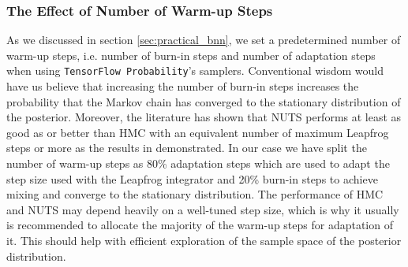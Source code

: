 \subsubsection{The Effect of Number of Warm-up Steps}
As we discussed in section \ref{sec:practical_bnn}, we set a predetermined number of warm-up steps, i.e. number of burn-in steps and number of adaptation steps when using {\tt TensorFlow Probability}'s samplers.
Conventional wisdom would have us believe that increasing the number of burn-in steps increases the probability that the Markov chain has converged
to the stationary distribution of the posterior. Moreover, the literature has shown that NUTS performs at least as good as or better than HMC with an equivalent number of maximum Leapfrog steps or more as the results in \cite{nuts} demonstrated. In our case we have split the number of warm-up steps as 80\% adaptation steps which are used to adapt the step size used with the Leapfrog integrator and 20\% burn-in steps to achieve mixing and converge to the stationary distribution. The performance of HMC and NUTS may depend heavily on a well-tuned step size, which is why it usually is recommended to allocate the majority of the warm-up steps for adaptation of it. This should help with efficient exploration of the sample space of the posterior distribution.

